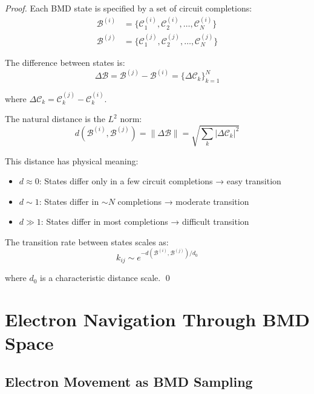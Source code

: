 \begin{proof}
Each BMD state is specified by a set of circuit completions:
\begin{align}
\mathcal{B}^{(i)} &= \{\mathcal{C}_1^{(i)}, \mathcal{C}_2^{(i)}, \ldots, \mathcal{C}_N^{(i)}\} \\
\mathcal{B}^{(j)} &= \{\mathcal{C}_1^{(j)}, \mathcal{C}_2^{(j)}, \ldots, \mathcal{C}_N^{(j)}\}
\end{align}

The difference between states is:
\begin{equation}
\Delta\mathcal{B} = \mathcal{B}^{(j)} - \mathcal{B}^{(i)} = \{\Delta\mathcal{C}_k\}_{k=1}^{N}
\end{equation}

where $\Delta\mathcal{C}_k = \mathcal{C}_k^{(j)} - \mathcal{C}_k^{(i)}$.

The natural distance is the $L^2$ norm:
\begin{equation}
d(\mathcal{B}^{(i)}, \mathcal{B}^{(j)}) = \|\Delta\mathcal{B}\| = \sqrt{\sum_{k} |\Delta\mathcal{C}_k|^2}
\end{equation}

This distance has physical meaning:
\begin{itemize}
\item $d \approx 0$: States differ only in a few circuit completions → easy transition
\item $d \sim 1$: States differ in $\sim N$ completions → moderate transition
\item $d \gg 1$: States differ in most completions → difficult transition
\end{itemize}

The transition rate between states scales as:
\begin{equation}
k_{ij} \sim e^{-d(\mathcal{B}^{(i)}, \mathcal{B}^{(j)}) / d_0}
\end{equation}

where $d_0$ is a characteristic distance scale. \qed
\end{proof}

\section{Electron Navigation Through BMD Space}

\subsection{Electron Movement as BMD Sampling}

